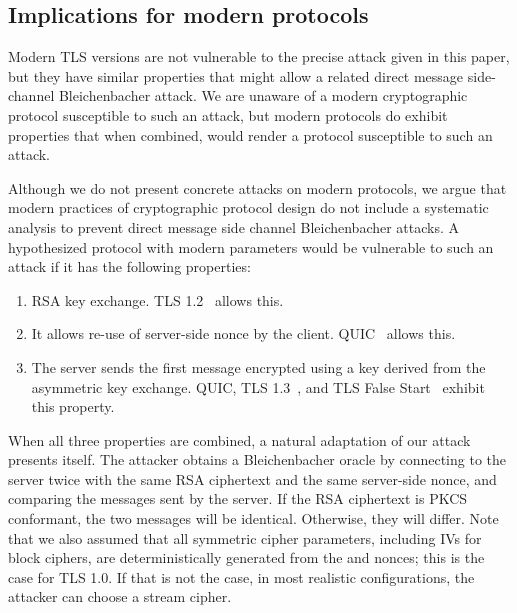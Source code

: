 \subsection{Implications for modern protocols}
Modern TLS versions are not vulnerable to the precise attack given in this paper, but they have similar properties that might allow a related \ifext direct message side-channel Bleichenbacher \fi attack.  \ifext We are unaware of a modern cryptographic protocol susceptible to such an attack, but modern protocols do exhibit properties that when combined, would render a protocol susceptible to such an attack. \fi

Although we do not present concrete attacks on modern protocols, we argue that modern practices of cryptographic protocol design do not include a systematic analysis to prevent direct message side channel Bleichenbacher attacks.  A hypothesized protocol with modern parameters would be vulnerable to such an attack if it has the following properties:

\begin{enumerate}
	\item RSA key exchange. TLS 1.2~\cite{rfc5246} allows this.
	\item It allows re-use of server-side nonce by the client. QUIC~\cite{langley2014quic} allows this.
	\item The server sends the first message encrypted using a key derived from the asymmetric key exchange. QUIC, TLS 1.3~\cite{TLS1_3}, and TLS False Start~\cite{FalseStart} exhibit this property.
\end{enumerate}

When all three properties are combined, a natural adaptation of our attack presents itself.
The attacker obtains a Bleichenbacher oracle by connecting to the server twice with the same RSA ciphertext and the same server-side nonce, and comparing the messages sent by the server.
If the RSA ciphertext is PKCS conformant, the two messages will be identical.
Otherwise, they will differ.
Note that we also assumed that all symmetric cipher parameters, including IVs for block ciphers, are deterministically generated from the \pms and nonces; this is the case for TLS 1.0.
If that is not the case, in most realistic configurations, the attacker can choose a stream cipher.

\ifext

